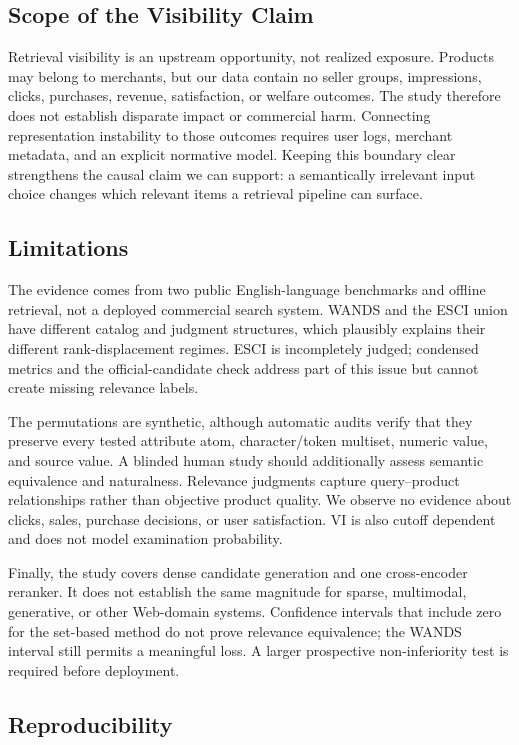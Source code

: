 \subsection{Scope of the Visibility Claim}

Retrieval visibility is an upstream opportunity, not realized exposure. Products may belong to merchants, but our data contain no seller groups, impressions, clicks, purchases, revenue, satisfaction, or welfare outcomes. The study therefore does not establish disparate impact or commercial harm. Connecting representation instability to those outcomes requires user logs, merchant metadata, and an explicit normative model. Keeping this boundary clear strengthens the causal claim we can support: a semantically irrelevant input choice changes which relevant items a retrieval pipeline can surface.

\subsection{Limitations}

The evidence comes from two public English-language benchmarks and offline retrieval, not a deployed commercial search system. WANDS and the ESCI union have different catalog and judgment structures, which plausibly explains their different rank-displacement regimes. ESCI is incompletely judged; condensed metrics and the official-candidate check address part of this issue but cannot create missing relevance labels.

The permutations are synthetic, although automatic audits verify that they preserve every tested attribute atom, character/token multiset, numeric value, and source value. A blinded human study should additionally assess semantic equivalence and naturalness. Relevance judgments capture query--product relationships rather than objective product quality. We observe no evidence about clicks, sales, purchase decisions, or user satisfaction. VI is also cutoff dependent and does not model examination probability.

Finally, the study covers dense candidate generation and one cross-encoder reranker. It does not establish the same magnitude for sparse, multimodal, generative, or other Web-domain systems. Confidence intervals that include zero for the set-based method do not prove relevance equivalence; the WANDS interval still permits a meaningful loss. A larger prospective non-inferiority test is required before deployment.

\subsection{Reproducibility}

